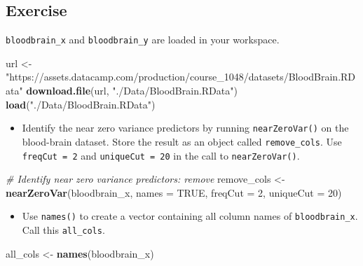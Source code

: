 \documentclass[]{book}
\newenvironment{Shaded}{\begin{snugshade}}{\end{snugshade}}
\newcommand{\KeywordTok}[1]{\textcolor[rgb]{0.13,0.29,0.53}{\textbf{#1}}}
\newcommand{\DataTypeTok}[1]{\textcolor[rgb]{0.13,0.29,0.53}{#1}}
\newcommand{\DecValTok}[1]{\textcolor[rgb]{0.00,0.00,0.81}{#1}}
\newcommand{\StringTok}[1]{\textcolor[rgb]{0.31,0.60,0.02}{#1}}
\newcommand{\CommentTok}[1]{\textcolor[rgb]{0.56,0.35,0.01}{\textit{#1}}}
\newcommand{\OtherTok}[1]{\textcolor[rgb]{0.56,0.35,0.01}{#1}}
\newcommand{\NormalTok}[1]{#1}
\providecommand{\tightlist}{%
  \setlength{\itemsep}{0pt}\setlength{\parskip}{0pt}}
\begin{document}
\subsection*{Exercise}\label{exercise-26}

\texttt{bloodbrain\_x} and \texttt{bloodbrain\_y} are loaded in your
workspace.

\begin{Shaded}
\begin{Highlighting}[]
\NormalTok{url <-}\StringTok{ "https://assets.datacamp.com/production/course_1048/datasets/BloodBrain.RData"}
\KeywordTok{download.file}\NormalTok{(url, }\StringTok{"./Data/BloodBrain.RData"}\NormalTok{)}
\KeywordTok{load}\NormalTok{(}\StringTok{"./Data/BloodBrain.RData"}\NormalTok{)}
\end{Highlighting}
\end{Shaded}

\begin{itemize}
\tightlist
\item
  Identify the near zero variance predictors by running
  \texttt{nearZeroVar()} on the blood-brain dataset. Store the result as
  an object called \texttt{remove\_cols}. Use \texttt{freqCut\ =\ 2} and
  \texttt{uniqueCut\ =\ 20} in the call to \texttt{nearZeroVar()}.
\end{itemize}

\begin{Shaded}
\begin{Highlighting}[]
\CommentTok{# Identify near zero variance predictors: remove}
\NormalTok{remove_cols <-}\StringTok{ }\KeywordTok{nearZeroVar}\NormalTok{(bloodbrain_x, }\DataTypeTok{names =} \OtherTok{TRUE}\NormalTok{, }\DataTypeTok{freqCut =} \DecValTok{2}\NormalTok{, }\DataTypeTok{uniqueCut =} \DecValTok{20}\NormalTok{)}
\end{Highlighting}
\end{Shaded}

\begin{itemize}
\tightlist
\item
  Use \texttt{names()} to create a vector containing all column names of
  \texttt{bloodbrain\_x}. Call this \texttt{all\_cols}.
\end{itemize}

\begin{Shaded}
\begin{Highlighting}[]
\NormalTok{all_cols <-}\StringTok{ }\KeywordTok{names}\NormalTok{(bloodbrain_x)}
\end{Highlighting}
\end{Shaded}
\end{document}
